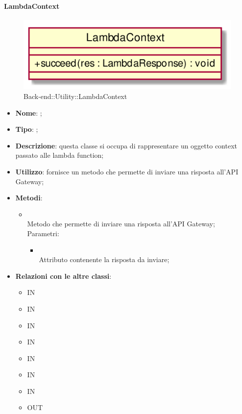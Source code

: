 \hypertarget{LambdaContext_label}{\paragraph{LambdaContext}}
\begin{figure}[h]
	\centering
	\includegraphics[width=\textwidth,height=\textheight,keepaspectratio]{images/ClassLambdaContext.png}
	\caption{Back-end::Utility::LambdaContext}
\end{figure}
\begin{itemize}
	\item \textbf{Nome}: ;
	\item \textbf{Tipo}: ;
	\item \textbf{Descrizione}: questa classe si occupa di rappresentare un oggetto context passato alle lambda function;
	\item \textbf{Utilizzo}: fornisce un metodo che permette di inviare una risposta all'API Gateway;
	\item \textbf{Metodi}:
	\begin{itemize}
		\item[]  \\
		Metodo che permette di inviare una risposta all'API Gateway;\\
		Parametri:
		\begin{itemize}
			\item {} \\
			Attributo contenente la risposta da inviare;
		\end{itemize}
	\end{itemize}
	\item \textbf{Relazioni con le altre classi}:
	\begin{itemize}
		\item IN \hyperlink{VocalAPI_label}{}
		\item IN \hyperlink{NotificationService_label}{}
		\item IN \hyperlink{UsersService_label}{}
		\item IN \hyperlink{VAService_label}{}
		\item IN \hyperlink{<<interface>> WebhookService_label}{}
		\item IN \hyperlink{RulesService_label}{}
		\item IN \hyperlink{ConversationWebhookService_label}{}
		\item OUT \hyperlink{LambdaResponse_label}{}
	\end{itemize}
\end{itemize}
\FloatBarrier

